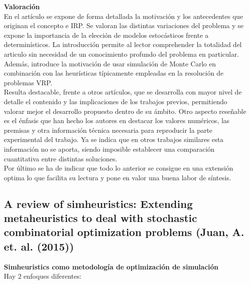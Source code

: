 \documentclass[11pt]{article} %
\begin{document}
\textbf{Valoración}\\[0.2cm]

En el artículo se expone de forma detallada la motivación y los antecedentes que originan el concepto e IRP. Se valoran las distintas variaciones del problema y se expone la importancia de la elección de modelos estocásticos frente a determinísticos. La introducción permite al lector comprehender la totalidad del articulo sin necesidad de un conocimiento profundo del problema en particular. Además, introduce la motivación de usar simulación de Monte Carlo en combinación con las heurísticas típicamente empleadas en la resolución de problemas VRP. \\[0.2cm]
Resulta destacable, frente a otros artículos, que se desarrolla con mayor nivel de detalle el contenido y las implicaciones de los trabajos previos, permitiendo valorar mejor el desarrollo propuesto dentro de su ámbito. Otro aspecto reseñable es el énfasis que han hecho los autores en destacar los valores numéricos, las premisas y otra información técnica necesaria para reproducir la parte experimental del trabajo. Ya se indica que en otros trabajos similares esta información no se aporta, siendo imposible establecer una comparación cuantitativa entre distintas soluciones. \\[0.2cm]
Por último se ha de indicar que todo lo anterior se consigue en una extensión optima lo que facilita su lectura y pone en valor una buena labor de síntesis. 

\clearpage

\subsection{A review of simheuristics: Extending metaheuristics to deal with stochastic combinatorial optimization problems (Juan, A. et. al. (2015))}

\textbf{Simheuristics como metodología de optimización de simulación}\\[0.2cm]
Hay 2 enfoques diferentes:
\end{document}
